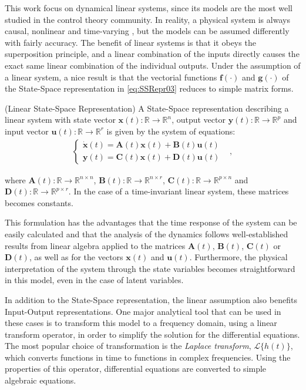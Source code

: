 \documentclass[a4paper,11pt]{book}
\numberwithin{figure}{chapter}
\numberwithin{equation}{chapter}
\numberwithin{table}{chapter}
\theoremstyle{definition}
\newtheorem{definition}{Definition}[chapter]
\newcounter{boxed-theorem}
\newcounter{boxed-definition}
\newenvironment{boxed-definition}[1]
{\begin{shaded} \begin{definition}{#1}}
{\end{definition} \end{shaded}}
\begin{document}
This work focus on dynamical linear systems, since its models are the most well studied in the control theory community. In reality, a physical system is always causal, nonlinear and time-varying \cite{Vidyasagar:2002}, but the models can be assumed differently with fairly accuracy. The benefit of linear systems is that it obeys the superposition principle, and a linear combination of the inputs directly causes the exact same linear combination of the individual outputs. Under the assumption of a linear system, a nice result is that the vectorial functions $\bm{f}(\cdot)$ and $\bm{g}(\cdot)$ of the State-Space representation in \eqref{eq:SSRepr03} reduces to simple matrix forms.

\begin{boxed-definition}{(Linear State-Space Representation)}
    A State-Space representation describing a linear system with state vector $\bm{x}(t) : \mathbb{R} \rightarrow \mathbb{R}^{n}$, output vector $\bm{y}(t) : \mathbb{R} \rightarrow \mathbb{R}^{p}$ and input vector $\bm{u}(t) : \mathbb{R} \rightarrow \mathbb{R}^{r}$ is given by the system of equations: 
    \begin{align} \label{eq:SSRepr04}
    \begin{cases}
        \dot{\bm{x}}(t) = \bm{A}(t) \bm{x}(t) + \bm{B}(t) \bm{u}(t) & \\
        \bm{y}(t) = \bm{C}(t) \bm{x}(t) + \bm{D}(t) \bm{u}(t) &
    \end{cases}
    ,\end{align}

    \noindent where $\bm{A}(t) : \mathbb{R} \rightarrow \mathbb{R}^{n \times n}$, $\bm{B}(t) : \mathbb{R} \rightarrow \mathbb{R}^{n \times r}$, $\bm{C}(t) : \mathbb{R} \rightarrow \mathbb{R}^{p \times n}$ and $\bm{D}(t) : \mathbb{R} \rightarrow \mathbb{R}^{p \times r}$. In the case of a time-invariant linear system, these matrices becomes constants. 
\end{boxed-definition}

This formulation has the advantages that the time response of the system can be easily calculated and that the analysis of the dynamics follows well-established results from linear algebra applied to the matrices $\bm{A}(t)$, $\bm{B}(t)$, $\bm{C}(t)$ or $\bm{D}(t)$, as well as for the vectors $\bm{x}(t)$ and $\bm{u}(t)$. Furthermore, the physical interpretation of the system through the state variables becomes straightforward in this model, even in the case of latent variables. 

In addition to the State-Space representation, the linear assumption also benefits Input-Output representations. One major analytical tool that can be used in these cases is to transform this model to a frequency domain, using a linear transform operator, in order to simplify the solution for the differential equations. The most popular choice of transformation is the \textit{Laplace transform}, $\mathcal{L}\{ h(t) \}$, which converts functions in time to functions in complex frequencies. Using the properties of this operator, differential equations are converted to simple algebraic equations.
\end{document}

